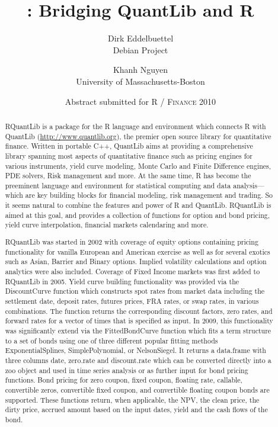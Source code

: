 \documentclass[11pt]{article}
\author{Dirk Eddelbuettel\\Debian Project 
  \and Khanh Nguyen\\University of Massachusetts-Boston}
\title{\pkg{RQuantLib}: Bridging QuantLib and R}
\date{Abstract submitted for \textsc{R / Finance 2010}}
\let\proglang=\textsf
\newcommand{\pkg}[1]{{\fontseries{b}\selectfont #1}}
\begin{document}
\maketitle
\thispagestyle{empty}
\begin{abstract}
  \noindent %
  \addtolength{\parskip}{\baselineskip} %
  \pkg{RQuantLib} is a package for the \proglang{R} language and environment
  which connects \proglang{R} with QuantLib (\url{http://www.quantlib.org}),
  the premier open source library for quantitative finance. Written in
  portable \proglang{C++}, QuantLib aims at providing a comprehensive library
  spanning most aspects of quantitative finance such as pricing engines for
  various instruments, yield curve modeling, Monte Carlo and Finite
  Difference engines, PDE solvers, Risk management and more. At the same
  time, \proglang{R} has become the preeminent language and environment for
  statistical computing and data analysis---which are key building blocks for
  financial modeling, risk management and trading. So it seems natural to
  combine the features and power of \proglang{R} and QuantLib.
  \pkg{RQuantLib} is aimed at this goal, and provides a collection of
  functions for option and bond pricing, yield curve interpolation, financial
  markets calendaring and more.

  \pkg{RQuantLib} was started in 2002 with coverage of equity options
  containing pricing functionality for vanilla European and American exercise
  as well as for several exotics such as Asian, Barrier and Binary options.
  Implied volatility calculations and option analytics were also included.
  Coverage of Fixed Income markets was first added to \pkg{RQuantLib} in
  2005. Yield curve building functionality was provided via the DiscountCurve
  function which constructs spot rates from market data including the
  settlement date, deposit rates, futures prices, FRA rates, or swap rates,
  in various combinations. The function returns the corresponding discount
  factors, zero rates, and forward rates for a vector of times that is
  specified as input. In 2009, this functionality was significantly extend
  via the FittedBondCurve function which fits a term structure to a set of
  bonds using one of three different popular fitting methods
  ExponentialSplines, SimplePolynomial, or NelsonSiegel.  It returns a
  data.frame with three columns date, zero.rate and discount.rate which can
  be converted directly into a \pkg{zoo} object and used in time series
  analysis or as further input for bond pricing functions. Bond pricing for
  zero coupon, fixed coupon, floating rate, callable, convertible zeros,
  convertible fixed coupon, and convertible floating coupon bonds are
  supported. These functions return, when applicable, the NPV, the clean
  price, the dirty price, accrued amount based on the input dates, yield and
  the cash flows of the bond.


\end{abstract}
\end{document}
